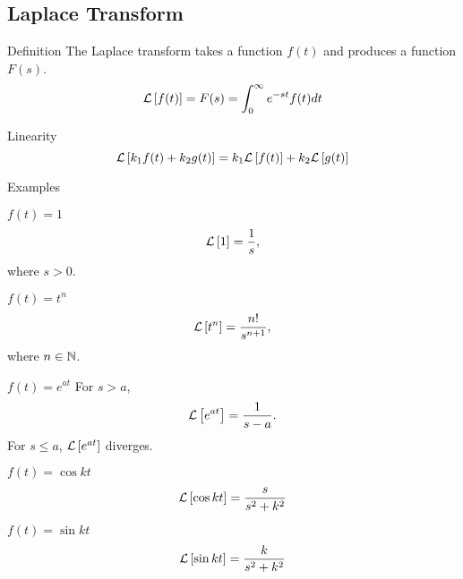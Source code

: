\subsection{Laplace Transform}

\begin{topics}
	\begin{topic}{Definition}
		The Laplace transform takes a function $f(t)$ and produces a function $F(s)$.
		\begin{equation}
			\mathcal{L} \left[ f(t) \right] = F(s) = \int_0^{\infty} e^{-st} f(t) dt
		\end{equation}
	\end{topic}

	\begin{topic}{Linearity}
		\begin{equation}
			\mathcal{L} \left[ k_1 f(t) + k_2 g(t) \right] = k_1 \mathcal{L} \left[ f(t) \right] + k_2 \mathcal{L} \left[ g(t) \right]
		\end{equation}
	\end{topic}

	\begin{topic}{Examples}
		\begin{topics}
			\begin{topic}{$f(t) = 1$}
				\begin{equation}
					\mathcal{L} \left[ 1 \right] = \frac{1}{s},
				\end{equation}
				where $s>0$.
			\end{topic}

			\begin{topic}{$f(t) = t^n$}
				\begin{equation}
					\mathcal{L} \left[ t^n \right] = \frac{n!}{s^{n+1}},
				\end{equation}
				where $n \in \mathbb{N}$.
			\end{topic}

			\begin{topic}{$f(t) = e^{at}$}
				For $s > a$,
				\begin{equation}
					\mathcal{L} \left[ e^{at} \right] = \frac{1}{s-a}.
				\end{equation}
				For $s \leq a$, $\mathcal{L} \left[ e^{at} \right]$ diverges.
			\end{topic}

			\begin{topic}{$f(t) = \cos kt$}
				\begin{equation}
					\mathcal{L} \left[ \cos kt \right] = \frac{s}{s^2 + k^2}
				\end{equation}
			\end{topic}

			\begin{topic}{$f(t) = \sin kt$}
				\begin{equation}
					\mathcal{L} \left[ \sin kt \right] = \frac{k}{s^2 + k^2}
				\end{equation}
			\end{topic}
		\end{topics}
	\end{topic}
\end{topics}
